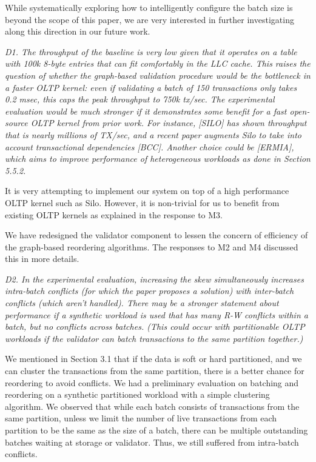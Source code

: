\documentclass{article}
\begin{document}
While systematically exploring how to intelligently configure the batch size is beyond the scope of this paper, we are very interested in further investigating along this direction in our future work.

\emph{D1. The throughput of the baseline is very low given that it operates on a table with 100k 8-byte entries that can fit comfortably in the LLC cache. This raises the question of whether the graph-based validation procedure would be the bottleneck in a faster OLTP kernel: even if validating a batch of 150 transactions only takes 0.2 msec, this caps the peak throughput to 750k tx/sec. The experimental evaluation would be much stronger if it demonstrates some benefit for a fast open-source OLTP kernel from prior work. For instance, [SILO] has shown throughput that is nearly millions of TX/sec, and a recent paper augments Silo to take into account transactional dependencies [BCC]. Another choice could be [ERMIA], which aims to improve performance of heterogeneous workloads as done in Section 5.5.2.}

It is very attempting to implement our system on top of a high performance OLTP kernel such as Silo. However, it is non-trivial for us to benefit from existing OLTP kernels as explained in the response to M3. 

We have redesigned the validator component to lessen the concern of efficiency of the graph-based reordering algorithms. The responses to M2 and M4 discussed this in more details.

\emph{D2. In the experimental evaluation, increasing the skew simultaneously increases intra-batch conflicts (for which the paper proposes a solution) with inter-batch conflicts (which aren't handled). There may be a stronger statement about performance if a synthetic workload is used that has many R-W conflicts within a batch, but no conflicts across batches. (This could occur with partitionable OLTP workloads if the validator can batch transactions to the same partition together.)}

We mentioned in Section 3.1 that if the data is soft or hard partitioned, and we can cluster the transactions from the same partition, there is a better chance for reordering to avoid conflicts. We had a preliminary evaluation on batching and reordering on a synthetic partitioned workload with a simple clustering algorithm. We observed that while each batch consists of transactions from the same partition, unless we limit the number of live transactions from each partition to be the same as the size of a batch, there can be multiple outstanding batches waiting at storage or validator. Thus, we still suffered from intra-batch conflicts. 
\end{document}
